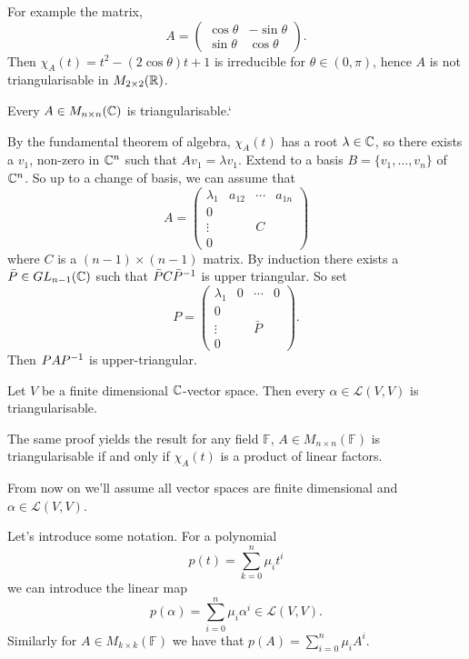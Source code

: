 \documentclass{article}
\newcommand{\F}{\mathbb{F}}
\begin{document}
For example the matrix,
\[
  A=\begin{pmatrix}
	  \cos\theta & -\sin\theta \\
	  \sin\theta & \cos\theta
  \end{pmatrix}.
\]
Then $ \chi_A(t)=t^2-(2\cos\theta)t+1 $ is irreducible for $ \theta\in(0,\pi) $, hence $ A $ is not triangularisable in $ M_{2\times 2}(\mathbb{R}) $.
	\begin{theorem}
		Every $ A\in M_{n\times n}(\mathbb{C}) $ is triangularisable.`
	\end{theorem}
	\pf By the fundamental theorem of algebra, $ \chi_A(t) $ has a root $ \lambda\in \mathbb{C} $, so there exists a $ v_1 $, non-zero in $ \mathbb{C}^n $ such that $ Av_1=\lambda v_1 $. Extend to a basis $ B=\{v_1,\dots, v_n\} $ of $ \mathbb{C}^n $. So up to a change of basis, we can assume that
	\[
	  A=\begin{pmatrix}
		  \lambda_1 & a_{12} & \cdots & a_{1n} \\
		  0 &  & & \\
		  \vdots &  & C\\
		  0 & & & 
	  \end{pmatrix}
	\]
	where $ C $ is a $ (n-1)\times (n-1) $ matrix. By induction there exists a $ \bar P\in GL_{n-1}(\mathbb{C}) $ such that $ \bar PC{\bar P}^{-1} $ is upper triangular. So set
	\[
	  P=\begin{pmatrix}
		  \lambda_1 & 0 & \cdots & 0 \\
		  0 &  & & \\
		  \vdots &  & \bar P & \\
		  0 & & & 
	  \end{pmatrix}.
	\]
Then $ PA{P}^{-1} $ is upper-triangular.
	\begin{corollary}
	  Let $ V $ be a finite dimensional $ \mathbb{C} $-vector space. Then every $ \alpha\in \mathcal L(V,V) $ is triangularisable.
	\end{corollary}
\begin{remark}
	The same proof yields the result for any field $ \F$, $ A\in M_{n\times n}(\F) $ is triangularisable if and only if $ \chi_A(t) $ is a product of linear factors.
\end{remark}
From now on we'll assume all vector spaces are finite dimensional and $ \alpha\in \mathcal L(V,V) $.\par
Let's introduce some notation. For a polynomial
\[
	p(t)=\sum_{k=0}^n\mu_it^i
\]
we can introduce the linear map
\[
	p(\alpha)=\sum_{i=0}^n\mu_i\alpha^i\in\mathcal L(V,V).
\]
Similarly for $ A\in M_{k\times k}(\F) $ we have that $ p(A)=\sum_{i=0}^n\mu_iA^i $.
\end{document}
